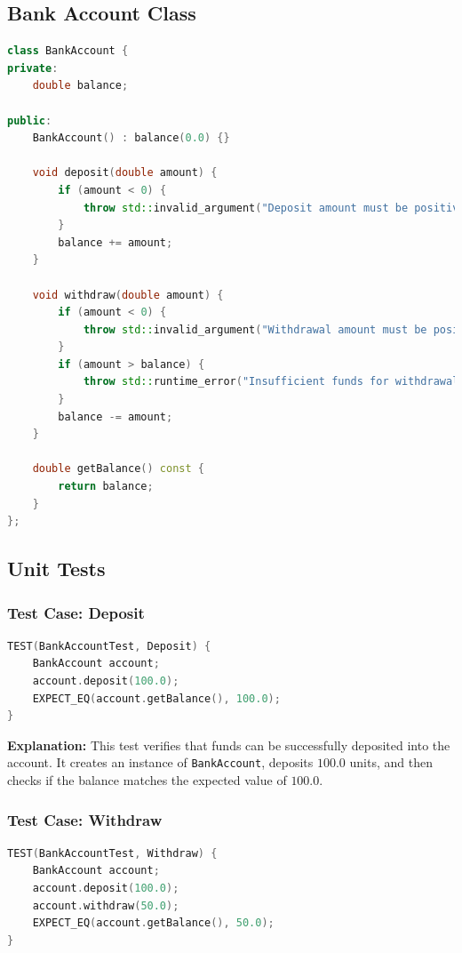 \subsection*{Bank Account Class}

\begin{lstlisting}[language=C++]
class BankAccount {
private:
    double balance;

public:
    BankAccount() : balance(0.0) {}

    void deposit(double amount) {
        if (amount < 0) {
            throw std::invalid_argument("Deposit amount must be positive");
        }
        balance += amount;
    }

    void withdraw(double amount) {
        if (amount < 0) {
            throw std::invalid_argument("Withdrawal amount must be positive");
        }
        if (amount > balance) {
            throw std::runtime_error("Insufficient funds for withdrawal");
        }
        balance -= amount;
    }

    double getBalance() const {
        return balance;
    }
};
\end{lstlisting}

\subsection*{Unit Tests}

\subsubsection*{Test Case: Deposit}
\begin{lstlisting}[language=C++]
TEST(BankAccountTest, Deposit) {
    BankAccount account;
    account.deposit(100.0);
    EXPECT_EQ(account.getBalance(), 100.0);
}
\end{lstlisting}

\textbf{Explanation:} This test verifies that funds can be successfully deposited into the account. It creates an instance of \texttt{BankAccount}, deposits $100.0$ units, and then checks if the balance matches the expected value of $100.0$.

\subsubsection*{Test Case: Withdraw}
\begin{lstlisting}[language=C++]
TEST(BankAccountTest, Withdraw) {
    BankAccount account;
    account.deposit(100.0);
    account.withdraw(50.0);
    EXPECT_EQ(account.getBalance(), 50.0);
}
\end{lstlisting}

